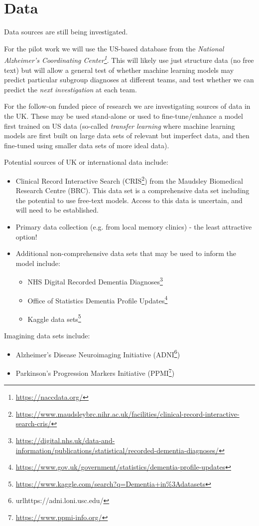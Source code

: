 \section{Data}


Data sources are still being investigated.

For the pilot work we will use the US-based database from the \emph{National Alzheimer's Coordinating Center\footnote{\url{https://naccdata.org/}}}. This will likely use just structure data (no free text) but will allow a general test of whether machine learning models may predict particular subgroup diagnoses at different teams, and test whether we can predict the \emph{next investigation} at each team.

For the follow-on funded piece of research we are investigating sources of data in the UK. These may be used stand-alone or used to fine-tune/enhance a model first trained on US data (so-called \emph{transfer learning} where machine learning models are first built on large data sets of relevant but imperfect data, and then fine-tuned using smaller data sets of more ideal data).

Potential sources of UK or international data include:

\begin{itemize}
    \item Clinical Record Interactive Search (CRIS\footnote{\url{https://www.maudsleybrc.nihr.ac.uk/facilities/clinical-record-interactive-search-cris/}}) from the Maudsley Biomedical Research Centre (BRC). This data set is a comprehensive data set including the potential to use free-text models. Access to this data is uncertain, and will need to be established.
    \item Primary data collection (e.g. from local memory clinics) - the least attractive option!
    \item Additional non-comprehensive data sets that may be used to inform the model include:
    \begin{itemize}
        \item NHS Digital Recorded Dementia Diagnoses\footnote{\url{https://digital.nhs.uk/data-and-information/publications/statistical/recorded-dementia-diagnoses/}}
        \item Office of Statistics Dementia Profile Updates\footnote{\url{https://www.gov.uk/government/statistics/dementia-profile-updates}}
        \item Kaggle data sets\footnote{\url{https://www.kaggle.com/search?q=Dementia+in\%3Adatasets}}
    \end{itemize}
\end{itemize}

Imagining data sets include:

\begin{itemize}
    \item Alzheimer’s Disease Neuroimaging Initiative (ADNI\footnote{url{https://adni.loni.usc.edu/}})
    \item Parkinson's Progression Markers Initiative (PPMI\footnote{\url{https://www.ppmi-info.org/}})
\end{itemize}
